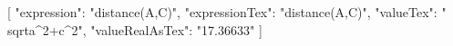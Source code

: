 ﻿[
  {
    "expression": "distance(A,C)",
    "expressionTex": "distance(A,C)",
    "valueTex": "\\sqrt{a^{2}+c^{2}}",
    "valueRealAsTex": "17.36633"
  }
]
